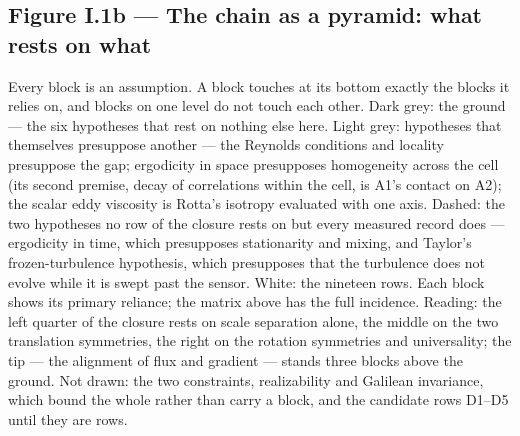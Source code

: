 \newpage
\subsection*{Figure I.1b --- The chain as a pyramid: what rests on what}
{\footnotesize Every block is an assumption. A block touches at its bottom exactly the blocks it relies on, and
blocks on one level do not touch each other. Dark grey: the ground --- the six hypotheses that rest on nothing
else here. Light grey: hypotheses that themselves presuppose another --- the Reynolds conditions and locality
presuppose the gap; ergodicity in space presupposes homogeneity across the cell (its second premise, decay of
correlations within the cell, is A1's contact on A2); the scalar eddy viscosity is Rotta's isotropy evaluated with
one axis. Dashed: the two hypotheses no row of the closure rests on but every measured record does --- ergodicity
in time, which presupposes stationarity and mixing, and Taylor's frozen-turbulence hypothesis, which presupposes
that the turbulence does not evolve while it is swept past the sensor. White: the nineteen rows. Each block shows
its primary reliance; the matrix above has the full incidence. Reading: the left quarter of the closure rests on
scale separation alone, the middle on the two translation symmetries, the right on the rotation symmetries and
universality; the tip --- the alignment of flux and gradient --- stands three blocks above the ground. Not drawn:
the two constraints, realizability and Galilean invariance, which bound the whole rather than carry a block, and
the candidate rows D1--D5 until they are rows. \par}
\vspace{1ex}
